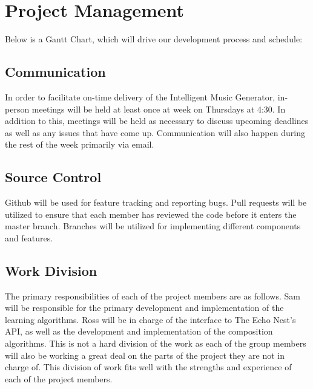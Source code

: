 \documentclass{article}
\begin{document}
\section{Project Management}
Below is a Gantt Chart, which will drive our development process and schedule:
\begin{figure}[ht]
\end{figure}

\subsection{Communication}
In order to facilitate on-time delivery of the Intelligent Music Generator, in-person meetings will be held at least once at week on Thursdays at 4:30. In addition to this, meetings will be held as necessary to discuss upcoming deadlines as well as any issues that have come up. Communication will also happen during the rest of the week primarily via email.

\subsection{Source Control}
Github will be used for feature tracking and reporting bugs.  Pull requests will be utilized to ensure that each member has reviewed the code before it enters the master branch.  Branches will be utilized for implementing different components and features.

\subsection{Work Division}
The primary responsibilities of each of the project members are as follows. Sam will be responsible for the primary development and implementation of the learning algorithms. Ross will be in charge of the interface to The Echo Nest's API, as well as the development and implementation of the composition algorithms. This is not a hard division of the work as each of the group members will also be working a great deal on the parts of the project they are not in charge of. This division of work fits well with the strengths and experience of each of the project members.
\end{document}
